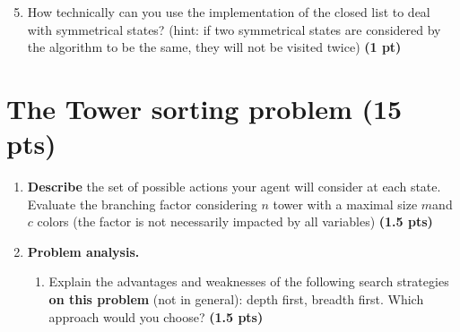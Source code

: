 \documentclass[11pt,a4paper]{report}
\begin{document}
\begin{answer}
\end{answer}



\begin{enumerate}
\setcounter{enumi}{4}
    \item How technically can you use the implementation of the closed list to deal with symmetrical states? (hint: if two symmetrical states are considered by the algorithm to be the same, they will not be visited twice) \textbf{(1 pt)}
\end{enumerate}

\begin{answer}
\end{answer}




\section{The Tower sorting problem (15 pts)}

\begin{enumerate}
  \item \textbf{Describe} the set of possible actions your agent will consider at each state. 
  Evaluate the branching factor considering $n$ tower with a maximal size $m$and $c$ colors (the factor is not necessarily impacted by all variables) \textbf{(1.5 pts)}
\end{enumerate}

\begin{answer}
\end{answer}



\begin{enumerate}
\setcounter{enumi}{1}
    \item \textbf{Problem analysis.}
    \begin{enumerate}
        \item Explain the advantages and weaknesses of the following search strategies \textbf{on this problem} (not in general): depth first, breadth first. Which approach would you choose? \textbf{(1.5 pts)}
    \end{enumerate}
\end{enumerate}

\begin{answer}
\end{answer}
\end{document}
